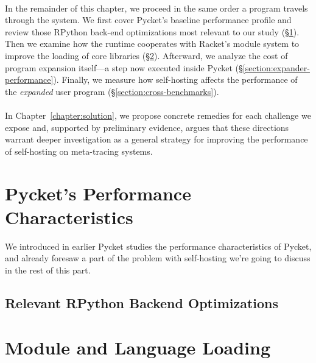 	\paragraph{}%
		In the remainder of this chapter, we proceed in the same order a program travels through the system. We first cover Pycket’s baseline performance profile and review those RPython back-end optimizations most relevant to our study (\S\ref{section:pycket-performance-characteristics}). Then we examine how the runtime cooperates with Racket’s module system to improve the loading of core libraries (\S\ref{section:module-and-language-loading}). Afterward, we analyze the cost of program expansion itself—a step now executed inside Pycket (\S\ref{section:expander-performance}). Finally, we measure how self-hosting affects the performance of the \emph{expanded} user program (\S\ref{section:cross-benchmarks}).

	\paragraph{}%
		In Chapter~\ref{chapter:solution}, we propose concrete remedies for each challenge we expose and, supported by preliminary evidence, argues that these directions warrant deeper investigation as a general strategy for improving the performance of self-hosting on meta-tracing systems.

	\section{Pycket's Performance Characteristics}
	\label{section:pycket-performance-characteristics}
        \begin{mainpoint}
            We introduced in earlier Pycket studies the performance characteristics of Pycket, and already foresaw a part of the problem with self-hosting we're going to discuss in the rest of this part.
        \end{mainpoint}

        \subsection{Relevant RPython Backend Optimizations}


	\section{Module and Language Loading}
	\label{section:module-and-language-loading}

